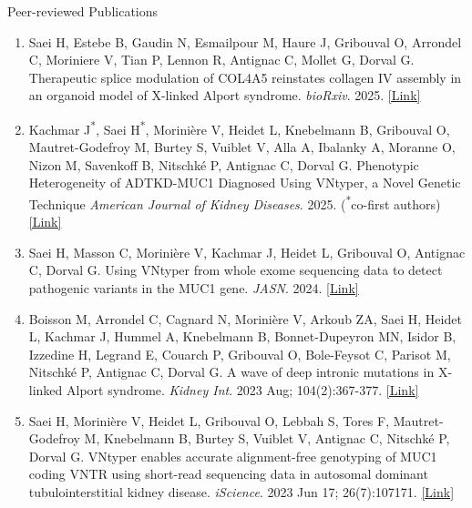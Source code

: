 \documentclass[
	11pt, %
]{resume} %
\begin{document}

\begin{rSection}{Peer-reviewed Publications}

\begin{enumerate}
  \item Saei H,  Estebe B, Gaudin N, Esmailpour M, Haure J,  Gribouval O,  Arrondel C,  Moriniere V,  Tian P,  Lennon R,  Antignac C,  Mollet G, Dorval G. 
  Therapeutic splice modulation of COL4A5 reinstates collagen IV assembly in an organoid model of X-linked Alport syndrome. 
  \textit{bioRxiv}. 2025. \href{https://www.biorxiv.org/content/10.1101/2025.06.10.658776v1}{[Link]}
  
    \item Kachmar J\textsuperscript{*}, Saei H\textsuperscript{*}, Morinière V, Heidet L, Knebelmann B, Gribouval O, Mautret-Godefroy M, Burtey S, Vuiblet V,  Alla A, Ibalanky A, Moranne O, Nizon M, Savenkoff B, Nitschké P, Antignac C, Dorval G.
  Phenotypic Heterogeneity of ADTKD-MUC1 Diagnosed Using VNtyper, a Novel Genetic Technique
  \textit{American Journal of Kidney Diseases}. 2025. (\textsuperscript{*}co-first authors) \href{https://www.ajkd.org/article/S0272-6386(25)00038-1/abstract}{[Link]}
  
  \item Saei H, Masson C, Morinière V, Kachmar J, Heidet L, Gribouval O, Antignac C, Dorval G. 
  Using VNtyper from whole exome sequencing data to detect pathogenic variants in the MUC1 gene. 
  \textit{JASN}. 2024. \href{https://journals.lww.com/jasn/fulltext/2025/02000/using_vntyper_from_whole_exome_sequencing_data_to.25.aspx}{[Link]}

  \item Boisson M, Arrondel C, Cagnard N, Morinière V, Arkoub ZA, Saei H, Heidet L, Kachmar J, Hummel A,
  Knebelmann B, Bonnet-Dupeyron MN, Isidor B, Izzedine H, Legrand E, Couarch P, Gribouval O, Bole-Feysot
  C, Parisot M, Nitschké P, Antignac C, Dorval G. A wave of deep intronic mutations in X-linked Alport syndrome.
  \textit{Kidney Int}. 2023 Aug; 104(2):367-377. \href{https://www.kidney-international.org/article/S0085-2538(23)00376-9/fulltext}{[Link]}

  \item Saei H, Morinière V, Heidet L, Gribouval O, Lebbah S, Tores F, Mautret-Godefroy M, Knebelmann B, Burtey
  S, Vuiblet V, Antignac C, Nitschké P, Dorval G. VNtyper enables accurate alignment-free genotyping
  of MUC1 coding VNTR using short-read sequencing data in autosomal dominant tubulointerstitial kidney
  disease. \textit{iScience}. 2023 Jun 17; 26(7):107171. \href{https://www.cell.com/action/showPdf?pii=S2589-0042%2823%2901248-8}{[Link]}


\end{enumerate}
\end{rSection}
\end{document}
